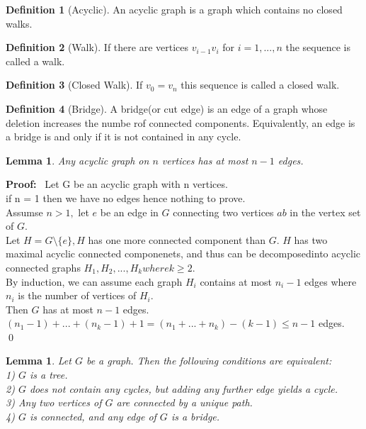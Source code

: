 \documentclass{article}
\theoremstyle{plain}
\newtheorem{lem}[thm]{Lemma}
\theoremstyle{definition}
\newtheorem{defn}{Definition}[section]
\theoremstyle{remark}
\newcommand\Proof{%
    \textbf{Proof:}~%
}
\begin{document}
\begin{defn}[Acyclic]
An acyclic graph is a graph which contains no closed walks.
\end{defn}

\begin{defn}[Walk]
If there are vertices $v_{i-1}v_i$ for $i = 1, ..., n$ the sequence is called a walk.
\end{defn}

\begin{defn}[Closed Walk]
If $v_0 = v_n$ this sequence is called a closed walk.
\end{defn}

\begin{defn}[Bridge]
A bridge(or cut edge) is an edge of a graph whose deletion increases the numbe rof connected components. Equivalently, an edge is a bridge is and only if it is not contained in any cycle.
\end{defn}

\vspace{10mm}

\begin{lem}
Any acyclic graph on $n$ vertices has at most $n-1$ edges.
\end{lem}
\noindent\Proof Let G be an acyclic graph with n vertices.\\
\noindent if n = 1 then we have no edges hence nothing to prove.\\
\noindent Assumse $n>1,$ let $e$ be an edge in $G$ connecting two vertices $ab$ in the vertex set of $G.$\\
\noindent Let $H = G \setminus \{e\}, H$ has one more connected component than $G.$ $H$ has two maximal acyclic connected componenets, and thus can be decomposedinto acyclic connected graphs $H_1, H_2, ..., H_k where k \geq 2.$\\
\noindent By induction, we can assume each graph $H_i$ contains at most $n_i - 1$ edges where $n_i$ is the number of vertices of $H_i.$\\
\noindent Then $G$ has at most $n-1$ edges.\\
\noindent $(n_1 - 1) + ... + (n_k - 1) + 1 = (n_1 + ... + n_k) - (k - 1) \leq n - 1$ edges.
\\ \qed

 \begin{lem}
 Let $G$ be a graph. Then the following conditions are equivalent:\\
 1) $G$ is a tree.\\
 2) $G$ does not contain any cycles, but adding any further edge yields a cycle.\\
 3) Any two vertices of $G$ are connected by a unique path.\\
 4) $G$ is connected, and any edge of $G$ is a bridge.
 \end{lem}
 
\end{document}
